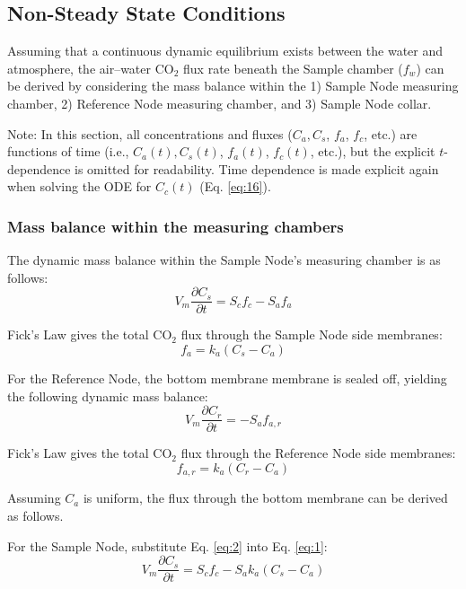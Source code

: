 \documentclass[11pt]{article}
\begin{document}
\subsection{Non-Steady State Conditions}
Assuming that a continuous dynamic equilibrium exists between the water and atmosphere, the air--water CO$_2$ flux rate beneath the Sample chamber ($f_w$) can be derived by considering the mass balance within the 1) Sample Node measuring chamber, 2) Reference Node measuring chamber, and 3) Sample Node collar.

Note: In this section, all concentrations and fluxes ($C_a, C_s$, $f_a$, $f_c$, etc.) are functions of time (i.e., $C_a(t), C_s(t)$, $f_a(t)$, $f_c(t)$, etc.), but the explicit $t$-dependence is omitted for readability. Time dependence is made explicit again when solving the ODE for $C_c(t)$ (Eq. \ref{eq:16}).

\subsubsection{Mass balance within the measuring chambers}

The dynamic mass balance within the Sample Node's measuring chamber is as follows:
\begin{equation} \label{eq:3}
	V_m \frac{\partial C_s}{\partial t} = S_c f_c - S_a f_a
\end{equation}

Fick's Law gives the total CO$_2$ flux through the Sample Node side membranes:
\begin{equation} \label{eq:4}
	f_a = k_a(C_s - C_a)
\end{equation}

For the Reference Node, the bottom membrane membrane is sealed off, yielding the following dynamic mass balance:
\begin{equation} \label{eq:5}
	V_m \frac{\partial C_r}{\partial t} = -S_a f_{a,r}
\end{equation}

Fick's Law gives the total CO$_2$ flux through the Reference Node side membranes:
\begin{equation} \label{eq:6}
	f_{a,r} = k_a(C_r - C_a)
\end{equation}

Assuming $C_a$ is uniform, the flux through the bottom membrane can be derived as follows.

For the Sample Node, substitute Eq. \ref{eq:2} into Eq. \ref{eq:1}:
\begin{equation} \label{eq:7}
	V_m \frac{\partial C_s}{\partial t} = S_c f_c - S_a k_a (C_s - C_a)
\end{equation}
\end{document}
